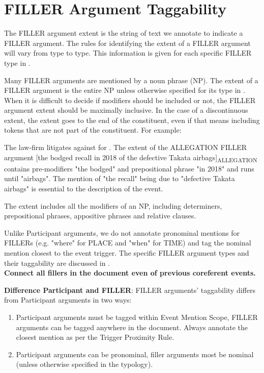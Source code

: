 \section{FILLER Argument Taggability} \label{sec:FILLERargtagg}
The FILLER argument extent is the string of text we annotate to indicate a FILLER argument.
The rules for identifying the extent of a FILLER argument will vary from type to type.
This information is given for each specific FILLER type in .

Many FILLER arguments are mentioned by a noun phrase (NP).
The extent of a FILLER argument is the entire NP unless otherwise specified for its type in .
When it is difficult to decide if modifiers should be included or not, the FILLER argument extent should be maximally inclusive.
In the case of a discontinuous extent, the extent goes to the end of the constituent, even if that means including tokens that are not part of the constituent.
For example:
\begin{exe}
    \ex The law-firm litigates  against  for  .
    \expl The extent of the ALLEGATION FILLER argument [the bodged recall in 2018 of the defective Takata airbags]\textsubscript{ALLEGATION} contains pre-modifiers "the bodged" and prepositional phrase "in 2018" and runs until "airbags". The mention of "the recall" being due to "defective Takata airbags" is essential to the description of the event.
\end{exe}

The extent includes all the modifiers of an NP, including determiners, prepositional phrases, appositive phrases and relative clauses.

Unlike Participant arguments, we do not annotate pronominal mentions for FILLERs (e.g. "where" for PLACE and "when" for TIME) and tag the nominal mention closest to the event trigger.
The specific FILLER argument types and their taggability are discussed in .\\[10pt]

\textbf{Connect all fillers in the document even of previous coreferent events.}

\textbf{Difference Participant and FILLER}:
FILLER arguments' taggability differs from Participant arguments in two ways:
\begin{enumerate}[noitemsep, leftmargin=*]
    \item Participant arguments must be tagged within Event Mention Scope, FILLER arguments can be tagged anywhere in the document. Always annotate the closest mention as per the Trigger Proximity Rule.
    \item Participant arguments can be pronominal, filler arguments most be nominal (unless otherwise specified in the typology).
\end{enumerate}
